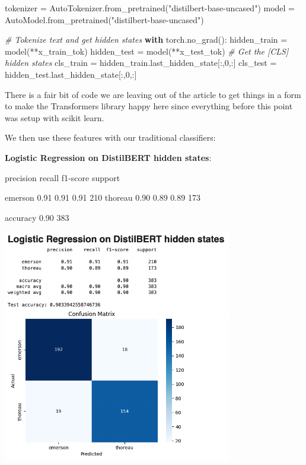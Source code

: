 \documentclass[
]{article}
\newenvironment{Shaded}{}{}
\newcommand{\CommentTok}[1]{\textcolor[rgb]{0.38,0.63,0.69}{\textit{#1}}}
\newcommand{\ControlFlowTok}[1]{\textcolor[rgb]{0.00,0.44,0.13}{\textbf{#1}}}
\newcommand{\DecValTok}[1]{\textcolor[rgb]{0.25,0.63,0.44}{#1}}
\newcommand{\NormalTok}[1]{#1}
\newcommand{\OperatorTok}[1]{\textcolor[rgb]{0.40,0.40,0.40}{#1}}
\newcommand{\StringTok}[1]{\textcolor[rgb]{0.25,0.44,0.63}{#1}}
\begin{document}
\begin{Shaded}
\begin{Highlighting}[]
\NormalTok{tokenizer }\OperatorTok{=}\NormalTok{ AutoTokenizer.from\_pretrained(}\StringTok{"distilbert{-}base{-}uncased"}\NormalTok{)}
\NormalTok{model }\OperatorTok{=}\NormalTok{ AutoModel.from\_pretrained(}\StringTok{"distilbert{-}base{-}uncased"}\NormalTok{)}

\CommentTok{\# Tokenize text and get hidden states}
\ControlFlowTok{with}\NormalTok{ torch.no\_grad():}
\NormalTok{    hidden\_train }\OperatorTok{=}\NormalTok{ model(}\OperatorTok{**}\NormalTok{x\_train\_tok)}
\NormalTok{    hidden\_test }\OperatorTok{=}\NormalTok{ model(}\OperatorTok{**}\NormalTok{x\_test\_tok)}
    \CommentTok{\# Get the [CLS] hidden states}
\NormalTok{    cls\_train }\OperatorTok{=}\NormalTok{ hidden\_train.last\_hidden\_state[:,}\DecValTok{0}\NormalTok{,:]}
\NormalTok{    cls\_test }\OperatorTok{=}\NormalTok{ hidden\_test.last\_hidden\_state[:,}\DecValTok{0}\NormalTok{,:]}
\end{Highlighting}
\end{Shaded}

There is a fair bit of code we are leaving out of the article to get
things in a form to make the Transformers library happy here since
everything before this point was setup with scikit learn.

We then use these features with our traditional classifiers:

\textbf{Logistic Regression on DistilBERT hidden states}:

\begin{Shaded}
\begin{Highlighting}[]
\NormalTok{precision    recall  f1{-}score   support}

\NormalTok{emerson       0.91      0.91      0.91       210}
\NormalTok{thoreau       0.90      0.89      0.89       173}

\NormalTok{accuracy                          0.90       383}
\end{Highlighting}
\end{Shaded}

\includegraphics[width=0.75\textwidth]{lr_dbert_confusion.png}
\end{document}
